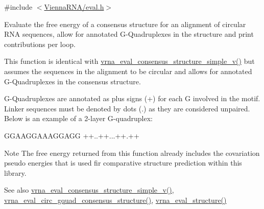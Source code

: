 {\ttfamily \#include $<$\hyperlink{eval_8h}{Vienna\+R\+N\+A/eval.\+h}$>$}



Evaluate the free energy of a consensus structure for an alignment of circular R\+NA sequences, allow for annotated G-\/\+Quadruplexes in the structure and print contributions per loop. 

This function is identical with \hyperlink{group__eval_gad88927c62ab0a8b534e078e44be1b36e}{vrna\+\_\+eval\+\_\+consensus\+\_\+structure\+\_\+simple\+\_\+v()} but assumes the sequences in the alignment to be circular and allows for annotated G-\/\+Quadruplexes in the consensus structure.

G-\/\+Quadruplexes are annotated as plus signs (\textquotesingle{}+\textquotesingle{}) for each G involved in the motif. Linker sequences must be denoted by dots (\textquotesingle{}.\textquotesingle{}) as they are considered unpaired. Below is an example of a 2-\/layer G-\/quadruplex\+: 
\begin{DoxyCode}
GGAAGGAAAGGAGG
++..++...++.++
\end{DoxyCode}


\begin{DoxyNote}{Note}
The free energy returned from this function already includes the covariation pseudo energies that is used fir comparative structure prediction within this library.
\end{DoxyNote}
\begin{DoxySeeAlso}{See also}
\hyperlink{group__eval_gad88927c62ab0a8b534e078e44be1b36e}{vrna\+\_\+eval\+\_\+consensus\+\_\+structure\+\_\+simple\+\_\+v()}, \hyperlink{group__eval_gac673ebb9ae2a29f54d201e2ac5b85540}{vrna\+\_\+eval\+\_\+circ\+\_\+gquad\+\_\+consensus\+\_\+structure()}, \hyperlink{group__eval_ga58f199f1438d794a265f3b27fc8ea631}{vrna\+\_\+eval\+\_\+structure()}
\end{DoxySeeAlso}

